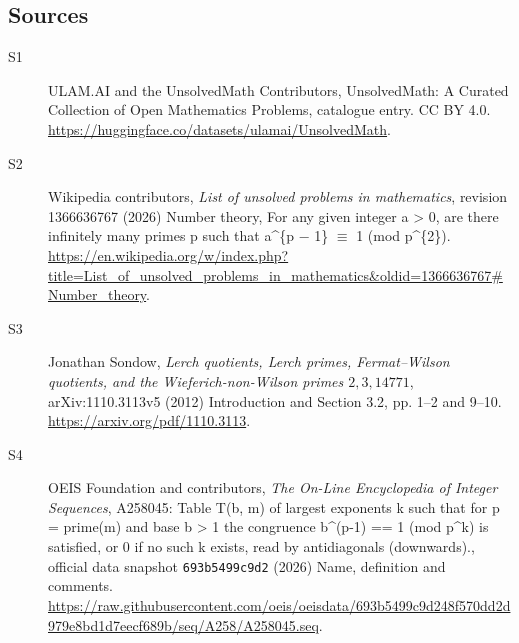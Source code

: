 \documentclass[11pt]{article}
\begin{document}
\subsection{Sources}
\begin{description}
\item[\hypertarget{source:statement:1}{S1}] ULAM.AI and the UnsolvedMath Contributors, UnsolvedMath: A Curated Collection of Open Mathematics Problems, catalogue entry. CC BY 4.0. \url{https://huggingface.co/datasets/ulamai/UnsolvedMath}.
\item[\hypertarget{source:statement:2}{S2}] Wikipedia contributors, \emph{List of unsolved problems in mathematics}, revision 1366636767 (2026) Number theory, For any given integer a > 0, are there infinitely many primes p such that a\textasciicircum{}\{p − 1\} $\equiv$ 1 (mod p\textasciicircum{}\{2\}). \url{https://en.wikipedia.org/w/index.php?title=List_of_unsolved_problems_in_mathematics&oldid=1366636767#Number_theory}.
\item[\hypertarget{source:statement:3}{S3}] Jonathan Sondow, \emph{Lerch quotients, Lerch primes, Fermat--Wilson quotients, and the Wieferich-non-Wilson primes $2,3,14771$}, arXiv:1110.3113v5 (2012) Introduction and Section 3.2, pp. 1--2 and 9--10. \url{https://arxiv.org/pdf/1110.3113}.
\item[\hypertarget{source:statement:4}{S4}] OEIS Foundation and contributors, \emph{The On-Line Encyclopedia of Integer Sequences}, A258045: Table T(b, m) of largest exponents k such that for p = prime(m) and base b > 1 the congruence b\textasciicircum{}(p-1) == 1 (mod p\textasciicircum{}k) is satisfied, or 0 if no such k exists, read by antidiagonals (downwards)., official data snapshot \texttt{693b5499c9d2} (2026) Name, definition and comments. \url{https://raw.githubusercontent.com/oeis/oeisdata/693b5499c9d248f570dd2d979e8bd1d7eecf689b/seq/A258/A258045.seq}.
\end{description}
\label{end:statement}
\end{document}
